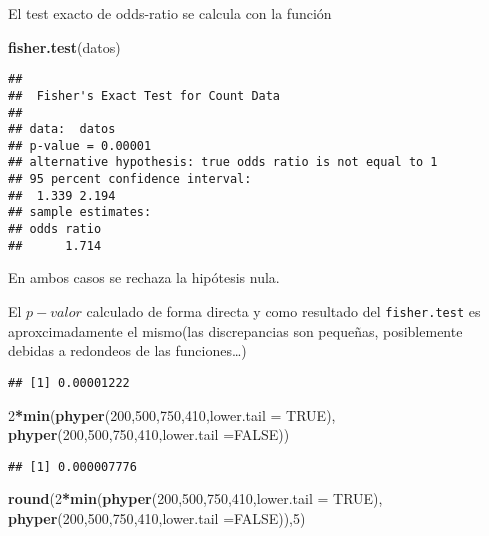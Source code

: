 \documentclass[
]{article}
\newenvironment{Shaded}{\begin{snugshade}}{\end{snugshade}}
\newcommand{\DataTypeTok}[1]{\textcolor[rgb]{0.13,0.29,0.53}{#1}}
\newcommand{\DecValTok}[1]{\textcolor[rgb]{0.00,0.00,0.81}{#1}}
\newcommand{\KeywordTok}[1]{\textcolor[rgb]{0.13,0.29,0.53}{\textbf{#1}}}
\newcommand{\NormalTok}[1]{#1}
\newcommand{\OperatorTok}[1]{\textcolor[rgb]{0.81,0.36,0.00}{\textbf{#1}}}
\newcommand{\OtherTok}[1]{\textcolor[rgb]{0.56,0.35,0.01}{#1}}
\begin{document}
El test exacto de odds-ratio se calcula con la función

\begin{Shaded}
\begin{Highlighting}[]
\KeywordTok{fisher.test}\NormalTok{(datos)}
\end{Highlighting}
\end{Shaded}

\begin{verbatim}
## 
##  Fisher's Exact Test for Count Data
## 
## data:  datos
## p-value = 0.00001
## alternative hypothesis: true odds ratio is not equal to 1
## 95 percent confidence interval:
##  1.339 2.194
## sample estimates:
## odds ratio 
##      1.714
\end{verbatim}

En ambos casos se rechaza la hipótesis nula.

El \(p-valor\) calculado de forma directa y como resultado del
\texttt{fisher.test} es aproxcimadamente el mismo(las discrepancias son
pequeñas, posiblemente debidas a redondeos de las funciones\ldots)

\begin{Shaded}
\end{Shaded}

\begin{verbatim}
## [1] 0.00001222
\end{verbatim}

\begin{Shaded}
\begin{Highlighting}[]
\DecValTok{2}\OperatorTok{*}\KeywordTok{min}\NormalTok{(}\KeywordTok{phyper}\NormalTok{(}\DecValTok{200}\NormalTok{,}\DecValTok{500}\NormalTok{,}\DecValTok{750}\NormalTok{,}\DecValTok{410}\NormalTok{,}\DataTypeTok{lower.tail =} \OtherTok{TRUE}\NormalTok{),}
            \KeywordTok{phyper}\NormalTok{(}\DecValTok{200}\NormalTok{,}\DecValTok{500}\NormalTok{,}\DecValTok{750}\NormalTok{,}\DecValTok{410}\NormalTok{,}\DataTypeTok{lower.tail =}\OtherTok{FALSE}\NormalTok{))}
\end{Highlighting}
\end{Shaded}

\begin{verbatim}
## [1] 0.000007776
\end{verbatim}

\begin{Shaded}
\begin{Highlighting}[]
\KeywordTok{round}\NormalTok{(}\DecValTok{2}\OperatorTok{*}\KeywordTok{min}\NormalTok{(}\KeywordTok{phyper}\NormalTok{(}\DecValTok{200}\NormalTok{,}\DecValTok{500}\NormalTok{,}\DecValTok{750}\NormalTok{,}\DecValTok{410}\NormalTok{,}\DataTypeTok{lower.tail =} \OtherTok{TRUE}\NormalTok{),}
            \KeywordTok{phyper}\NormalTok{(}\DecValTok{200}\NormalTok{,}\DecValTok{500}\NormalTok{,}\DecValTok{750}\NormalTok{,}\DecValTok{410}\NormalTok{,}\DataTypeTok{lower.tail =}\OtherTok{FALSE}\NormalTok{)),}\DecValTok{5}\NormalTok{)}
\end{Highlighting}
\end{Shaded}
\end{document}
